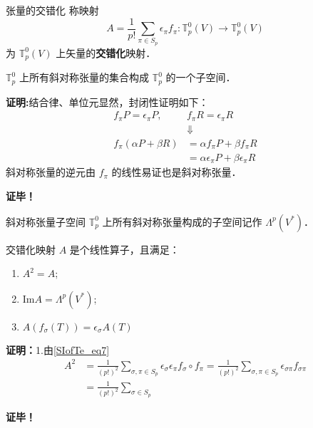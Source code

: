 \begin{definition}{张量的交错化}
称映射
\begin{equation}\label{SIofTe_eq7}
A=\frac{1}{p!}\sum_{\pi\in S_p}\epsilon_\pi f_\pi:\mathbb{T}_p^0(V)\rightarrow\mathbb{T}_p^0(V)
\end{equation}
为 $\mathbb{T}_p^0(V)$ 上矢量的\textbf{交错化}映射．
\end{definition}
\begin{theorem}{}
$\mathbb{T}_p^0$ 上所有斜对称张量的集合构成 $\mathbb{T}_p^0$ 的一个子空间．
\end{theorem}
\textbf{证明:}结合律、单位元显然，封闭性证明如下：
\begin{equation}
\begin{aligned}
f_\pi P=\epsilon_\pi P,\quad&f_\pi R=\epsilon_\pi R\\
&\Downarrow\\
f_\pi(\alpha P+\beta R)&=\alpha f_\pi P+\beta f_\pi R\\
&=\alpha \epsilon_\pi P+\beta \epsilon_\pi R
\end{aligned}
\end{equation}
斜对称张量的逆元由 $f_\pi$ 的线性易证也是斜对称张量．

\textbf{证毕！}
\begin{definition}{斜对称张量子空间}
$\mathbb{T}_p^0$ 上所有斜对称张量构成的子空间记作 $\Lambda^p(V^*)$．
\end{definition}
\begin{theorem}{}
交错化映射 $A$ 是个线性算子，且满足：
\begin{enumerate}
\item $A^2=A$;
\item $\mathrm{Im} A=\Lambda^p(V^*)$;
\item $A(f_\sigma(T))=\epsilon_\sigma A(T)$
\end{enumerate}
\end{theorem}
\textbf{证明：}1.由\autoref{SIofTe_eq7} 
\begin{equation}
\begin{aligned}
A^2&=\frac{1}{(p!)^2}\sum_{\sigma,\pi\in S_p}\epsilon_\sigma\epsilon_\pi f_\sigma\circ f_\pi=\frac{1}{(p!)^2}\sum_{\sigma,\pi\in S_p}\epsilon_{\sigma\pi} f_{\sigma\pi}\\
&=\frac{1}{(p!)^2}\sum_{\sigma\in S_p}
\end{aligned}
\end{equation}


\textbf{证毕！}